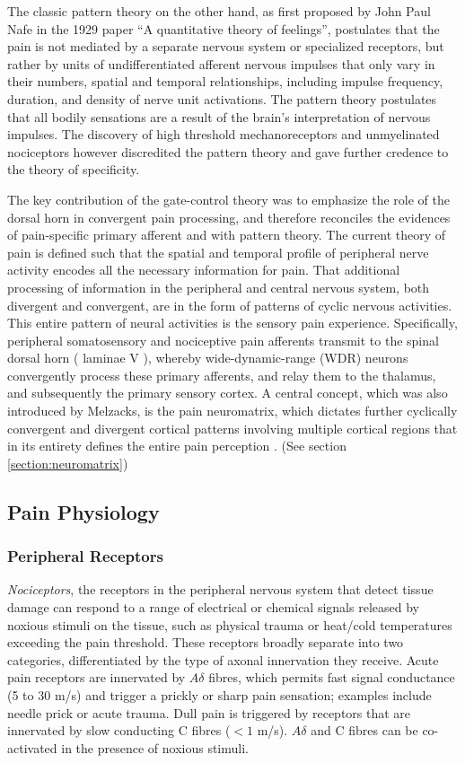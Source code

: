 The classic pattern theory on the other hand, as first proposed by John Paul Nafe in the 1929 paper “A quantitative theory of feelings”\cite{Nafe1929}, postulates that the pain is not mediated by a separate nervous system or specialized receptors, but rather by units of undifferentiated afferent nervous impulses that only vary in their numbers, spatial and temporal relationships, including impulse frequency, duration, and density of nerve unit activations. The pattern theory postulates that all bodily sensations are a result of the brain's interpretation of nervous impulses. The discovery of high threshold mechanoreceptors and unmyelinated nociceptors however discredited the pattern theory and gave further credence to the theory of specificity. 
 
The key contribution of the gate-control theory was to emphasize the role of the dorsal horn in convergent pain processing, and therefore reconciles the evidences of pain-specific primary afferent and with pattern theory. The current theory of pain is defined such that the spatial and temporal profile of peripheral nerve activity encodes all the necessary information for pain. That additional processing of information in the peripheral and central nervous system, both divergent and convergent, are in the form of patterns of cyclic nervous activities. This entire pattern of neural activities is the  sensory pain experience. Specifically, peripheral somatosensory and nociceptive pain afferents transmit to the spinal dorsal horn ( laminae V ), whereby wide-dynamic-range (WDR) neurons convergently process these primary afferents, and relay them to the thalamus, and subsequently the primary sensory cortex. A central concept, which was also introduced by Melzacks, is the pain neuromatrix, which dictates further cyclically convergent and divergent cortical patterns involving multiple cortical regions that in its entirety defines the entire pain perception \cite{Melzack1999}. (See section \ref{section:neuromatrix})


\subsection{Pain Physiology}

\subsubsection{Peripheral Receptors}

\textit{Nociceptors}, the receptors in the peripheral nervous system that detect tissue damage can respond to a range of electrical or chemical signals released by noxious stimuli on the tissue, such as physical trauma or heat/cold temperatures exceeding the pain threshold. These receptors broadly separate into two categories, differentiated by the type of axonal innervation they receive. Acute pain receptors are innervated by $A\delta$ fibres, which permits fast signal conductance (5 to 30 m/s) and trigger a prickly or sharp pain sensation; examples include needle prick or acute trauma. Dull pain is triggered by receptors that are innervated by slow conducting C fibres ($<1$ m/s). $A\delta$ and C fibres can be co-activated in the presence of noxious stimuli. 

